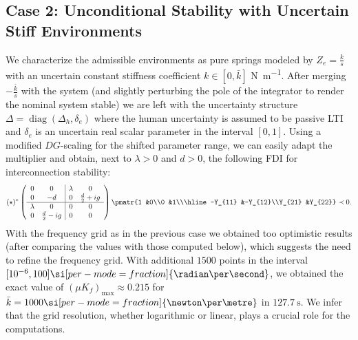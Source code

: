 \subsection{Case 2: Unconditional Stability with Uncertain Stiff Environments}\label{sec:numcase2}
We characterize the admissible environments as pure springs modeled by
$Z_e = \frac{k}{s}$ with an uncertain constant stiffness coefficient $k\in[0,\bar{k}]$ \si[per-mode=fraction]{\newton\per\metre}. After merging $-\frac{\bar{k}}{s}$ with the system (and slightly perturbing the pole of the integrator to render the nominal system stable) we are left with the uncertainty structure $\Delta = \operatorname{diag}(\Delta_h,\delta_e )$ where the human uncertainty is assumed to be passive LTI and $\delta_e$ is an uncertain real scalar parameter in the interval $[0,1]$. Using a modified $DG$-scaling for the shifted parameter range, we can easily adapt the multiplier and obtain, next to $\lambda>0$ and $d>0$, the following FDI
for interconnection stability:
\begin{equation}%
({\star})^*\left(\begin{array}{cc|cc}
      0&0  &\lambda &0 \\
      0&-d  &0         &\frac{d}{2} + ig\\ \hline
      \lambda &0 &0 &0\\
      0 &\frac{d}{2} - ig&0 &0
\end{array}\right)
\pmatr{1 &0\\0 &1\\\hline-Y_{11} &-Y_{12}\\Y_{21} &Y_{22}} \prec 0.
\label{eq:uncenvFDI}
\end{equation}
With the frequency grid as in the previous case we obtained too optimistic results (after comparing the values with those computed below), which suggests the need to refine the frequency grid.
With additional  $1500$ points in the interval $[10^{-6},100]\si[per-mode=fraction]{\radian\per\second}$,
we obtained the exact value of $(\mu K_f)_\text{max}\approx 0.215$ for $\bar{k}=1000\si[per-mode=fraction]{\newton\per\metre}$ in $\SI{127.7}{\second}$. We infer that the grid resolution, whether logarithmic or linear, plays a crucial role for the computations.

